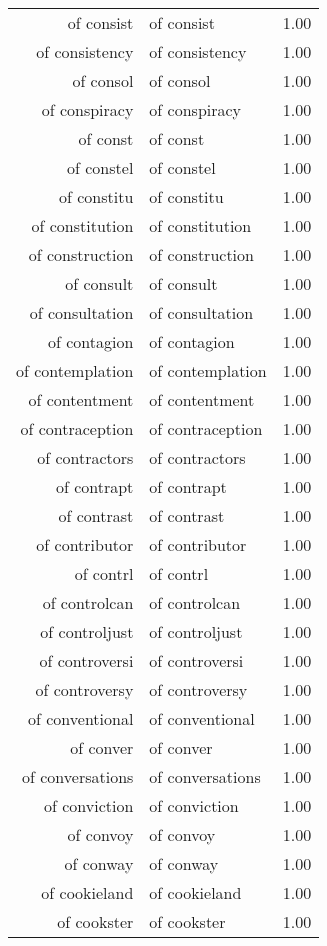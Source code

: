 \begin{table}[ht]
\begin{tabular}{rlr}
  of consist & of consist & 1.00 \\ 
  of consistency & of consistency & 1.00 \\ 
  of consol & of consol & 1.00 \\ 
  of conspiracy & of conspiracy & 1.00 \\ 
  of const & of const & 1.00 \\ 
  of constel & of constel & 1.00 \\ 
  of constitu & of constitu & 1.00 \\ 
  of constitution & of constitution & 1.00 \\ 
  of construction & of construction & 1.00 \\ 
  of consult & of consult & 1.00 \\ 
  of consultation & of consultation & 1.00 \\ 
  of contagion & of contagion & 1.00 \\ 
  of contemplation & of contemplation & 1.00 \\ 
  of contentment & of contentment & 1.00 \\ 
  of contraception & of contraception & 1.00 \\ 
  of contractors & of contractors & 1.00 \\ 
  of contrapt & of contrapt & 1.00 \\ 
  of contrast & of contrast & 1.00 \\ 
  of contributor & of contributor & 1.00 \\ 
  of contrl & of contrl & 1.00 \\ 
  of controlcan & of controlcan & 1.00 \\ 
  of controljust & of controljust & 1.00 \\ 
  of controversi & of controversi & 1.00 \\ 
  of controversy & of controversy & 1.00 \\ 
  of conventional & of conventional & 1.00 \\ 
  of conver & of conver & 1.00 \\ 
  of conversations & of conversations & 1.00 \\ 
  of conviction & of conviction & 1.00 \\ 
  of convoy & of convoy & 1.00 \\ 
  of conway & of conway & 1.00 \\ 
  of cookieland & of cookieland & 1.00 \\ 
  of cookster & of cookster & 1.00 \\ 

\end{tabular}
\end{table}
